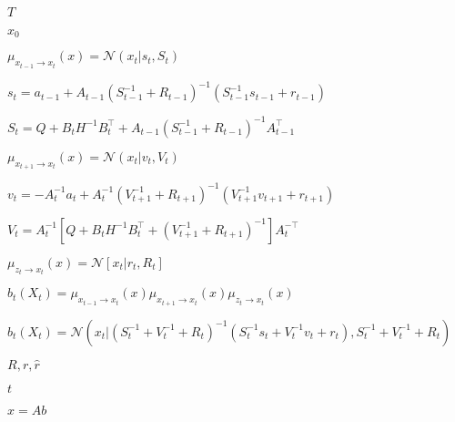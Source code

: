 \documentclass{article}
\begin{document}
$T$
\pagebreak

$x_0$
\pagebreak

$ \mu_{x_{t-1}\rightarrow x_t}(x)=\mathcal{N}(x_t|s_t,S_t) $
\pagebreak

$ s_t=a_{t-1}\!+\!A_{t-1}(S_{t-1}^{-1}\!+\!R_{t-1})^{-1}(S_{t-1}^{-1}s_{t-1}\!+\!r_{t-1}) $
\pagebreak

$ S_t=Q+B_tH^{-1}B_t^{\!\top\!} + A_{t-1}(S_{t-1}^{-1}+R_{t-1})^{-1}A_{t-1}^{\!\top\!} $
\pagebreak

$ \mu_{x_{t+1}\rightarrow x_t}(x)=\mathcal{N}(x_t|v_t,V_t) $
\pagebreak

$ v_t=-A_{t}^{-1}a_{t}\!\!+\!\!A_{t}^{-1}(V_{t+1}^{-1}\!\!+\!\!R_{t+1})^{-1}(V_{t+1}^{-1}v_{t+1}\!\!+\!\!r_{t+1}) $
\pagebreak

$ V_t=A_{t}^{-1}[Q+B_tH^{-1}B_t^{\!\top\!} + (V_{t+1}^{-1}+R_{t+1})^{-1}]A_{t}^{-{\!\top\!}} $
\pagebreak

$ \mu_{z_t\rightarrow x_t}(x)=\mathcal{N}[x_t|r_t,R_t] $
\pagebreak

$ b_t(X_t)=\mu_{x_{t-1}\rightarrow x_t}(x) \mu_{x_{t+1}\rightarrow x_t}(x) \mu_{z_t\rightarrow x_t}(x) $
\pagebreak

$ b_t(X_t)=\mathcal{N}\left(x_t|(S_t^{-1}+V_t^{-1}+R_t)^{-1}(S_t^{-1}s_t+V_t^{-1}v_t+r_t),S_t^{-1}+V_t^{-1}+R_t \right) $
\pagebreak

$ R, r, \hat{r} $
\pagebreak

$t$
\pagebreak

$x=Ab$
\pagebreak
\end{document}

